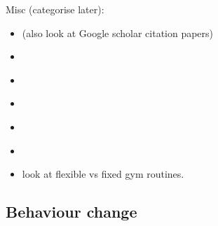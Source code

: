 \documentclass[a4paper, 11pt]{report}
\begin{document}
Misc (categorise later):
\begin{itemize}
	\item \citet{hussam2017habit} (also look at Google scholar citation papers)
	\item \citet{lally2013promoting}
	\item \citet{lally2010habits}
	\item \citet{courter2019break}
	\item \citet{hardwick2019time}
	\item \citet{carden2018habit}
	\item \citet{beshears2017creating} look at flexible vs fixed gym routines.
\end{itemize}


\subsection{Behaviour change}
\end{document}
